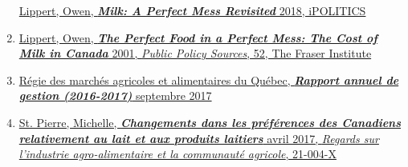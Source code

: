 \documentclass[11pt]{article}
\begin{document}
\begin{enumerate}
  \href{https://ipolitics.ca/article/milk-a-perfect-mess-revisited/}{Lippert,
  Owen, \textbf{\emph{Milk: A Perfect Mess Revisited}} 2018, iPOLITICS}
\item
  \href{https://www.fraserinstitute.org/sites/default/files/PerfectFoodinaPerfectMess.pdf}{Lippert,
  Owen, \textbf{\emph{The Perfect Food in a Perfect Mess: The Cost of
  Milk in Canada}} 2001, \emph{Public Policy Sources}, 52, The Fraser
  Institute}
\item
  \href{http://www.rmaaq.gouv.qc.ca//index.php?id=12}{Régie des marchés
  agricoles et alimentaires du Québec, \textbf{\emph{Rapport annuel de
  gestion (2016-2017)}} septembre 2017}
\item
  \href{https://www150.statcan.gc.ca/n1/pub/21-004-x/2017001/article/14786-fra.htm}{St.
  Pierre, Michelle, \textbf{\emph{Changements dans les préférences des
  Canadiens relativement au lait et aux produits laitiers}} avril 2017,
  \emph{Regards sur l'industrie agro-alimentaire et la communauté
  agricole}, 21-004-X}
\end{enumerate}


    
    
    
    
\end{document}
